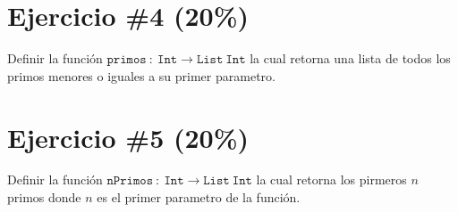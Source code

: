 \documentclass{article}
\begin{document}
\section*{Ejercicio \#4 (20\%)}
Definir la funci\'on $\mathtt{primos}\ :\ \mathtt{Int}\rightarrow \mathtt{List\ Int}$
la cual retorna una lista de todos los primos menores o iguales a su primer
parametro.

\section*{Ejercicio \#5 (20\%)}
Definir la funci\'on $\mathtt{nPrimos}\ :\ \mathtt{Int}\rightarrow \mathtt{List\ Int}$
la cual retorna los pirmeros $n$ primos donde $n$ es el primer parametro de la funci\'on.

% 
% 
\end{document}
